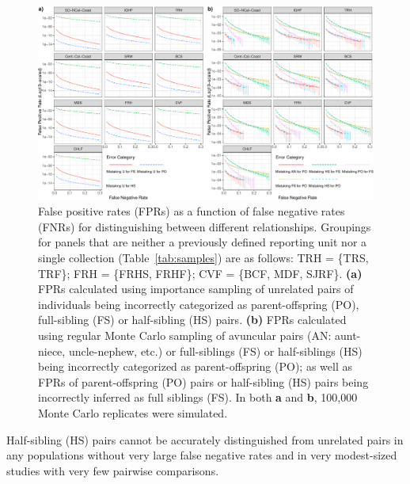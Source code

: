 \begin{figure}
\newcommand{\fprcap}{\footnotesize False positive rates (FPRs) as a function of false negative
rates (FNRs) for distinguishing between different relationships. Groupings for panels that are neither a previously defined reporting unit nor a single collection (Table~\protect\ref{tab:samples}) are as follows: TRH = \{TRS, TRF\}; FRH = \{FRHS, FRHF\}; CVF = \{BCF, MDF, SJRF\}.  {\bf (a)} FPRs calculated
using importance sampling of unrelated pairs of individuals being incorrectly categorized as parent-offspring (PO),
full-sibling (FS) or half-sibling (HS) pairs.  {\bf (b)}  FPRs calculated using regular Monte Carlo
sampling of avuncular pairs (AN: aunt-niece, uncle-nephew, etc.) or full-siblings (FS) or half-siblings (HS) being
incorrectly categorized as parent-offspring (PO); as well as FPRs of parent-offspring (PO) pairs or half-sibling (HS)
pairs being incorrectly inferred as full siblings (FS).  In both {\bf a} and {\bf b}, 100,000 Monte Carlo replicates
were simulated.}
\begin{center}
\includegraphics[width=\textwidth]{images/fpr-fnr-figure-crop.pdf}
\end{center}
\caption[\fprcap]{\fprcap}
\label{fig:fprs}
\end{figure}


Half-sibling (HS) pairs cannot be accurately
distinguished from unrelated pairs in any populations without very large false negative rates
and in very modest-sized studies with very few pairwise comparisons.  


